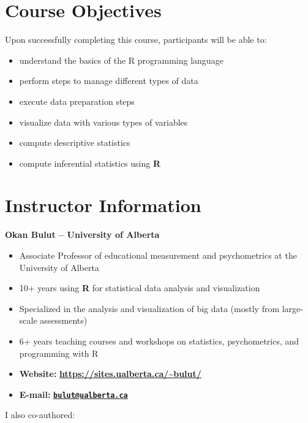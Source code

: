 \documentclass[]{book}
\providecommand{\tightlist}{%
  \setlength{\itemsep}{0pt}\setlength{\parskip}{0pt}}
\begin{document}
\hypertarget{course-objectives}{%
\section{Course Objectives}\label{course-objectives}}

Upon successfully completing this course, participants will be able to:

\begin{itemize}
\tightlist
\item
  understand the basics of the R programming language
\item
  perform steps to manage different types of data
\item
  execute data preparation steps
\item
  visualize data with various types of variables
\item
  compute descriptive statistics
\item
  compute inferential statistics using \textbf{R}
\end{itemize}

\hypertarget{instructor-information}{%
\section{Instructor Information}\label{instructor-information}}

\textbf{Okan Bulut -- University of Alberta}

\begin{itemize}
\tightlist
\item
  Associate Professor of educational measurement and psychometrics at the University of Alberta
\item
  10+ years using \textbf{R} for statistical data analysis and visualization
\item
  Specialized in the analysis and visualization of big data (mostly from large-scale assessments)
\item
  6+ years teaching courses and workshops on statistics, psychometrics, and programming with R
\item
  \textbf{Website:} \href{https://sites.ualberta.ca/~bulut/}{\textbf{https://sites.ualberta.ca/\textasciitilde{}bulut/}}
\item
  \textbf{E-mail:} \textbf{\href{mailto:bulut@ualberta.ca}{\nolinkurl{bulut@ualberta.ca}}}
\end{itemize}

I also co-authored:
\end{document}
